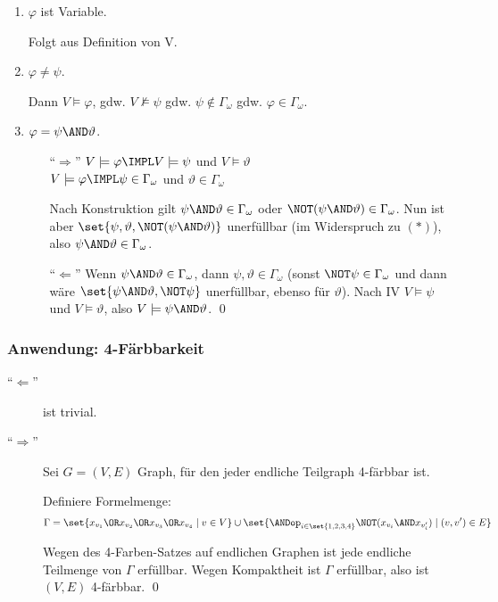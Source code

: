 \begin{enumerate}
  \item $\varphi$ ist Variable.\par
  Folgt aus Definition von V.
  
  \item $\varphi \not= \psi$.\par
  Dann $V\models\varphi$, gdw. $V\not\models\psi$ gdw. $\psi\not\in\Gamma_\omega$ gdw. $\varphi\in\Gamma_\omega$.
  
  \item $\varphi = \psi\AND\vartheta$.\par
  \begin{itemize}
    \item[\enquote{$\Rightarrow$}]
      $V\models\varphi \IMPL V\models\psi$ und $V\models\vartheta$\\
      $V\models\varphi \IMPL \psi\in\Gamma_\omega$ und $\vartheta\in\Gamma_\omega$
                                                    
    Nach Konstruktion gilt $\psi\AND\vartheta\in\Gamma_\omega$ oder
    $\NOT(\psi \AND \vartheta) \in \Gamma_\omega$. Nun ist aber
    $\set{\psi, \vartheta, \NOT(\psi \AND \vartheta)}$
    unerfüllbar (im Widerspruch zu $(*)$), also $\psi\AND\vartheta\in\Gamma_\omega$.
    
    \item[\enquote{$\Leftarrow$}]
    Wenn $\psi\AND\vartheta\in\Gamma_\omega$, dann $\psi,\vartheta\in\Gamma_\omega$
    (sonst $\NOT\psi\in\Gamma_\omega$ und dann wäre
    $\set{\psi\AND\vartheta, \NOT\psi}$ unerfüllbar, ebenso für $\vartheta$).
    Nach IV $V\models\psi$ und $V\models\vartheta$, also $V\models\psi\AND\vartheta$.
    \qed
  \end{itemize}
\end{enumerate}

\subsubsection{Anwendung: 4-Färbbarkeit}

\begin{description}
  \item[\enquote{$\Leftarrow$}] ist trivial.
  \item[\enquote{$\Rightarrow$}] Sei $G=(V,E)$ Graph, für den jeder endliche
  Teilgraph 4-färbbar ist.

  Definiere Formelmenge:
  \[
    \Gamma = \set{x_{v_1} \OR x_{v_2} \OR x_{v_3} \OR x_{v_4} \mid v \in V}
      \cup \set{\ANDop_{i\in\set{1,2,3,4}} \NOT (x_{v_i} \AND x_{v_i'}) \mid (v,v')\in E }
  \]

  Wegen des 4-Farben-Satzes auf endlichen Graphen ist jede endliche Teilmenge
  von $\Gamma$ erfüllbar. Wegen Kompaktheit ist $\Gamma$ erfüllbar, also ist
  $(V,E)$ 4-färbbar.
  \qed
\end{description}


